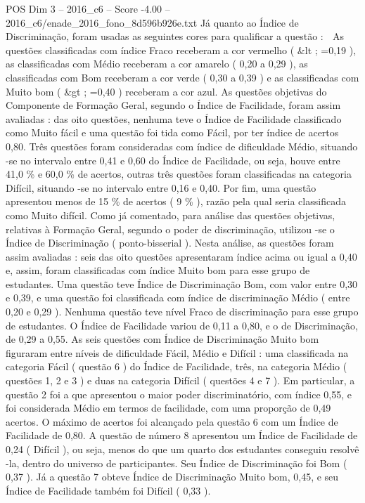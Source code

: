 \begin{textsample}{POS Dim 3 – 2016\_c6 – Score -4.00 – 2016\_c6/enade\_2016\_fono\_8d596b926e.txt}
Já quanto ao Índice de Discriminação, foram usadas as seguintes cores para qualificar a questão :  As questões classificadas com índice Fraco receberam a cor vermelho ( \&lt ; =0,19 ), as classificadas com Médio receberam a cor amarelo ( 0,20 a 0,29 ), as classificadas com Bom receberam a cor verde ( 0,30 a 0,39 ) e as classificadas com Muito bom ( \&gt ; =0,40 ) receberam a cor azul.
As questões objetivas do Componente de Formação Geral, segundo o Índice de Facilidade, foram assim avaliadas : das oito questões, nenhuma teve o Índice de Facilidade classificado como Muito fácil e uma questão foi tida como Fácil, por ter índice de acertos 0,80.
Três questões foram consideradas com índice de dificuldade Médio, situando -se no intervalo entre 0,41 e 0,60 do Índice de Facilidade, ou seja, houve entre 41,0 \% e 60,0 \% de acertos, outras três questões foram classificadas na categoria Difícil, situando -se no intervalo entre 0,16 e 0,40.
Por fim, uma questão apresentou menos de 15 \% de acertos ( 9 \% ), razão pela qual seria classificada como Muito difícil.
Como já comentado, para análise das questões objetivas, relativas à Formação Geral, segundo o poder de discriminação, utilizou -se o Índice de Discriminação ( ponto-bisserial ).
Nesta análise, as questões foram assim avaliadas : seis das oito questões apresentaram índice acima ou igual a 0,40 e, assim, foram classificadas com índice Muito bom para esse grupo de estudantes.
Uma questão teve Índice de Discriminação Bom, com valor entre 0,30 e 0,39, e uma questão foi classificada com índice de discriminação Médio ( entre 0,20 e 0,29 ).
Nenhuma questão teve nível Fraco de discriminação para esse grupo de estudantes.
O Índice de Facilidade variou de 0,11 a 0,80, e o de Discriminação, de 0,29 a 0,55.
As seis questões com Índice de Discriminação Muito bom figuraram entre níveis de dificuldade Fácil, Médio e Difícil : uma classificada na categoria Fácil ( questão 6 ) do Índice de Facilidade, três, na categoria Médio ( questões 1, 2 e 3 ) e duas na categoria Difícil ( questões 4 e 7 ).
Em particular, a questão 2 foi a que apresentou o maior poder discriminatório, com índice 0,55, e foi considerada Médio em termos de facilidade, com uma proporção de 0,49 acertos.
O máximo de acertos foi alcançado pela questão 6 com um Índice de Facilidade de 0,80.
A questão de número 8 apresentou um Índice de Facilidade de 0,24 ( Difícil ), ou seja, menos do que um quarto dos estudantes conseguiu resolvê -la, dentro do universo de participantes.
Seu Índice de Discriminação foi Bom ( 0,37 ).
Já a questão 7 obteve Índice de Discriminação Muito bom, 0,45, e seu Índice de Facilidade também foi Difícil ( 0,33 ).

\end{textsample}
